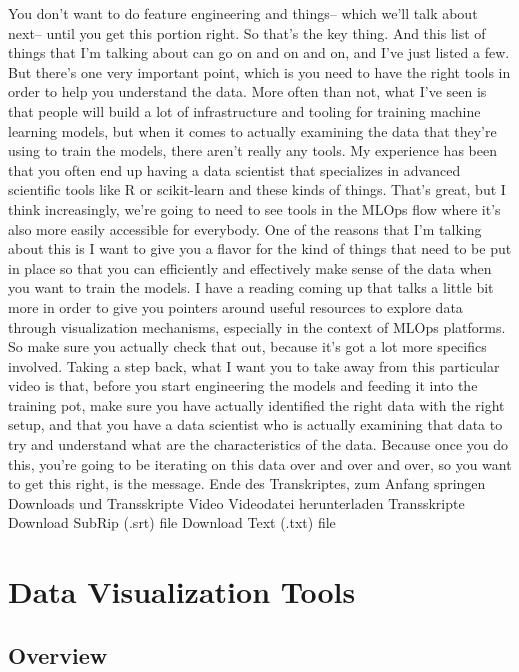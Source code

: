     You don't want to do feature engineering and things-- which
    we'll talk about next-- until you get this portion right.
    So that's the key thing.
    And this list of things that I'm talking about can go on and on and on,
    and I've just listed a few.
    But there's one very important point, which
    is you need to have the right tools in order to help you understand the data.
    More often than not, what I've seen is that people
    will build a lot of infrastructure and tooling
    for training machine learning models, but when it comes to actually examining
    the data that they're using to train the models, there aren't really any tools.
    My experience has been that you often end up
    having a data scientist that specializes in advanced scientific tools like R
    or scikit-learn and these kinds of things.
    That's great, but I think increasingly, we're
    going to need to see tools in the MLOps flow
    where it's also more easily accessible for everybody.
    One of the reasons that I'm talking about this
    is I want to give you a flavor for the kind of things
    that need to be put in place so that you can efficiently and effectively
    make sense of the data when you want to train the models.
    I have a reading coming up that talks a little bit more in order
    to give you pointers around useful resources
    to explore data through visualization mechanisms,
    especially in the context of MLOps platforms.
    So make sure you actually check that out,
    because it's got a lot more specifics involved.
    Taking a step back, what I want you to take away from this particular video
    is that, before you start engineering the models
    and feeding it into the training pot, make
    sure you have actually identified the right data with the right setup,
    and that you have a data scientist who is actually
    examining that data to try and understand what
    are the characteristics of the data.
    Because once you do this, you're going to be iterating on this data
    over and over and over, so you want to get this right, is the message.
    Ende des Transkriptes, zum Anfang springen
    Downloads und Transskripte
    Video
    Videodatei herunterladen
    Transskripte
    Download SubRip (.srt) file
    Download Text (.txt) file    
    
\section{Data Visualization Tools}

\subsection{Overview}

